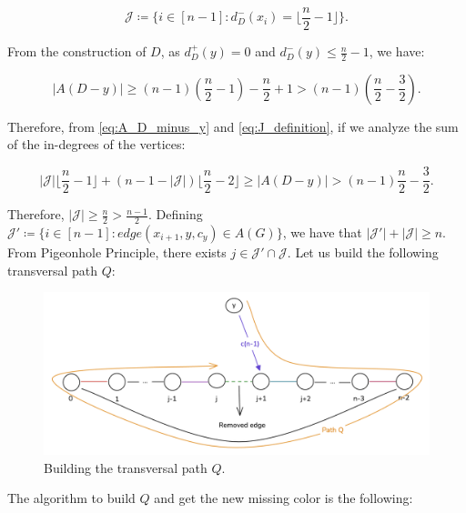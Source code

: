 \begin{equation}
    \mathcal{J} \coloneqq \{i \in [n-1]: d^-_D(x_i) = \lfloor \frac{n}{2} - 1 \rfloor\}.
    \label{eq:J_definition}
\end{equation}

From the construction of $D$, as $d^+_D(y) = 0$ and $d^-_D(y) \leq \frac{n}{2} - 1$, we have:

\begin{equation}
    |A(D - y)| \geq (n - 1) (\frac{n}{2} - 1) - \frac{n}{2} + 1 > (n - 1) (\frac{n}{2} - \frac{3}{2}).
    \label{eq:A_D_minus_y}
\end{equation}

Therefore, from \ref{eq:A_D_minus_y} and \ref{eq:J_definition}, if we analyze
the sum of the in-degrees of the vertices:

\begin{equation}
    |\mathcal{J}| \lfloor \frac{n}{2} - 1 \rfloor + (n - 1 - |\mathcal{J}|) \lfloor \frac{n}{2} - 2 \rfloor \geq |A(D - y)| > (n - 1) \frac{n}{2} - \frac{3}{2}.
\end{equation}

Therefore, $|\mathcal{J}| \geq \frac{n}{2} > \frac{n - 1}{2}$. Defining 
$\mathcal{J}' \coloneqq \{i \in [n - 1]: edge(x_{i+1}, y, c_y) \in A(G)\}$, we have that 
$|\mathcal{J}'| + |\mathcal{J}| \geq n$. From Pigeonhole Principle, there exists 
$j \in \mathcal{J}' \cap \mathcal{J}$. Let us build the following transversal path $Q$:

\begin{figure}[H]
    \centering
    \includegraphics[width=1\textwidth]{figuras/cycle_n-1_path_q.png}
    \caption{Building the transversal path $Q$.}
    \label{fig:cycle_n-1_path_q}
\end{figure}

The algorithm to build $Q$ and get the new missing color is the following:

